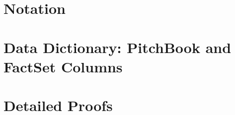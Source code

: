 \documentclass[11pt,a4paper,twoside,openany]{book}
\theoremstyle{plain}
\theoremstyle{definition}
\theoremstyle{remark}
\begin{document}
\appendix
\chapter{Notation}\label{app:notation}


\chapter{Data Dictionary: PitchBook and FactSet Columns}\label{app:columns}


\chapter{Detailed Proofs}\label{app:proofs}


\backmatter


\end{document}
